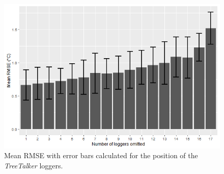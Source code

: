 \documentclass[5p]{elsarticle} %
\begin{document}
\begin{figure}[!h]
\begin{center}

\includegraphics[scale = 0.48]{mean_rmse_gesamt_barplot}
\caption{Mean RMSE with error bars calculated for the position of the \emph{TreeTalker} loggers.}
\end{center}
\end{figure}
\end{document}
